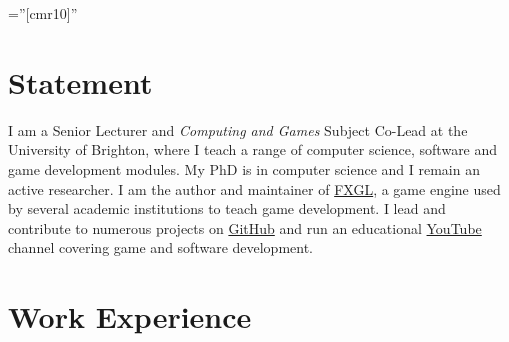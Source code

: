 \documentclass[a4paper,11pt]{article} %
\begin{document}
\pagestyle{empty} %

\font\fb=''[cmr10]'' %


\par{\bigskip\par} %

\section{Statement}

I am a Senior Lecturer and \textit{Computing and Games} Subject Co-Lead at the University of Brighton, where I teach a range of computer science, software and game development modules.
My PhD is in computer science and I remain an active researcher.
I am the author and maintainer of \href{https://github.com/AlmasB/FXGL}{FXGL}, a game engine used by several academic institutions to teach game development.
I lead and contribute to numerous projects on \href{https://github.com/AlmasB}{GitHub} and run an educational \href{https://www.youtube.com/almasb0/videos}{YouTube} channel covering game and software development.


\section{Work Experience}
\end{document}
